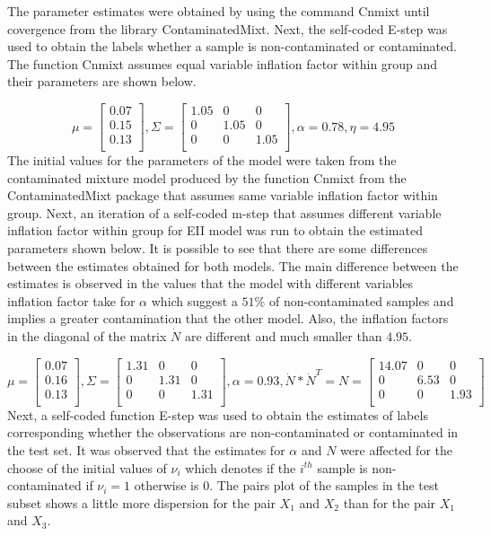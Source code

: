 \documentclass[
]{article}
\begin{document}
The parameter estimates were obtained by using the command Cnmixt until
covergence from the library ContaminatedMixt. Next, the self-coded
E-step was used to obtain the labels whether a sample is
non-contaminated or contaminated. The function Cnmixt assumes equal
variable inflation factor within group and their parameters are shown
below.

\[
\mu = \begin{bmatrix}0.07 \\0.15 \\0.13 \\\end{bmatrix} , \Sigma = \begin{bmatrix}1.05&0&0 \\0&1.05&0 \\0&0&1.05 \\\end{bmatrix}, \alpha = 0.78 , \eta = 4.95
\] The initial values for the parameters of the model were taken from
the contaminated mixture model produced by the function Cnmixt from the
ContaminatedMixt package that assumes same variable inflation factor
within group. Next, an iteration of a self-coded m-step that assumes
different variable inflation factor within group for EII model was run
to obtain the estimated parameters shown below. It is possible to see
that there are some differences between the estimates obtained for both
models. The main difference between the estimates is observed in the
values that the model with different variables inflation factor take for
\(\alpha\) which suggest a \(51\%\) of non-contaminated samples and
implies a greater contamination that the other model. Also, the
inflation factors in the diagonal of the matrix \(\dot{N}\) are
different and much smaller than \(4.95\).

\[
\mu = \begin{bmatrix}0.07 \\0.16 \\0.13 \\\end{bmatrix} , \Sigma = \begin{bmatrix}1.31&0&0 \\0&1.31&0 \\0&0&1.31 \\\end{bmatrix} , \alpha = 0.93, \dot{N} * \dot{N}^{T} = N = \begin{bmatrix}14.07&0&0 \\0&6.53&0 \\0&0&1.93 \\\end{bmatrix}
\] Next, a self-coded function E-step was used to obtain the estimates
of labels corresponding whether the observations are non-contaminated or
contaminated in the test set. It was observed that the estimates for
\(\alpha\) and \(N\) were affected for the choose of the initial values
of \(\nu_{i}\) which denotes if the \(i^{th}\) sample is
non-contaminated if \(\nu_{i}=1\) otherwise is \(0\). The pairs plot of
the samples in the test subset shows a little more dispersion for the
pair \(X_{1}\) and \(X_{2}\) than for the pair \(X_{1}\) and \(X_{3}\).
\end{document}
